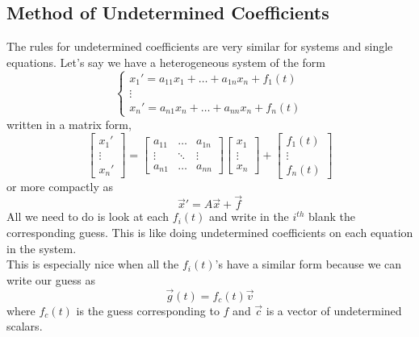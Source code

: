 \subsection{Method of Undetermined Coefficients}
\noindent
The rules for undetermined coefficients are very similar for systems and single equations. Let's say we have a heterogeneous system of the form
\begin{equation*}
	\begin{cases}
		x_1' = a_{11}x_1 + \ldots + a_{1n}x_n + f_1(t) \\
		\vdots \\
		x_n' = a_{n1}x_n + \ldots + a_{nn}x_n + f_n(t)
	\end{cases}
\end{equation*}
written in a matrix form,
\begin{equation*}
	\begin{bmatrix}
		x_1' \\
		\vdots \\
		x_n'
	\end{bmatrix} = \begin{bmatrix}
		a_{11} & \ldots & a_{1n} \\
		\vdots & \ddots & \vdots \\
		a_{n1} & \ldots & a_{nn}
	\end{bmatrix} \begin{bmatrix}
		x_1 \\
		\vdots \\
		x_n
	\end{bmatrix} + \begin{bmatrix}
		f_1(t) \\
		\vdots \\
		f_n(t)
	\end{bmatrix}
\end{equation*}
or more compactly as
\begin{equation*}
	\vec{x}' = A\vec{x} + \vec{f}
\end{equation*}
All we need to do is look at each $f_i(t)$ and write in the $i^{th}$ blank the corresponding guess. This is like doing undetermined coefficients on each equation in the system.\\

\noindent
This is especially nice when all the $f_i(t)$'s have a similar form because we can write our guess as
\begin{equation*}
	\vec{g}(t) = f_c(t)\vec{v}
\end{equation*}
where $f_c(t)$ is the guess corresponding to $f$ and $\vec{c}$ is a vector of undetermined scalars.

